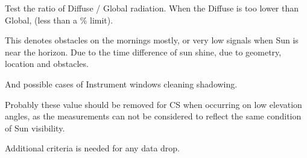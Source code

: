 \documentclass[
  10pt,
  a4paper,oneside]{article}
\newenvironment{Shaded}{\begin{snugshade}}{\end{snugshade}}
\newcommand{\CommentTok}[1]{\textcolor[rgb]{0.56,0.35,0.01}{\textit{#1}}}
\newcommand{\ConstantTok}[1]{\textcolor[rgb]{0.00,0.00,0.00}{#1}}
\newcommand{\ControlFlowTok}[1]{\textcolor[rgb]{0.13,0.29,0.53}{\textbf{#1}}}
\newcommand{\DecValTok}[1]{\textcolor[rgb]{0.00,0.00,0.81}{#1}}
\newcommand{\DocumentationTok}[1]{\textcolor[rgb]{0.56,0.35,0.01}{\textbf{\textit{#1}}}}
\newcommand{\ErrorTok}[1]{\textcolor[rgb]{0.64,0.00,0.00}{\textbf{#1}}}
\newcommand{\FunctionTok}[1]{\textcolor[rgb]{0.00,0.00,0.00}{#1}}
\newcommand{\NormalTok}[1]{#1}
\newcommand{\OtherTok}[1]{\textcolor[rgb]{0.56,0.35,0.01}{#1}}
\newcommand{\SpecialCharTok}[1]{\textcolor[rgb]{0.00,0.00,0.00}{#1}}
\newcommand{\StringTok}[1]{\textcolor[rgb]{0.31,0.60,0.02}{#1}}
\begin{document}
Test the ratio of Diffuse / Global radiation.
When the Diffuse is too lower than Global, (less than a \% limit).

This denotes obstacles on the mornings mostly, or very low
signals when Sun is near the horizon.
Due to the time difference of sun shine, due to geometry, location and
obstacles.

And possible cases of Instrument windows cleaning shadowing.

Probably these value should be removed for CS when occurring on low
elevation angles, as the measurements can not be considered to reflect
the same condition of Sun visibility.

Additional criteria is needed for any data drop.

\begin{Shaded}
\end{Shaded}
\end{document}
